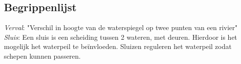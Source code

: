\documentclass[../verslag.tex]{subfiles}
\begin{document}
\subsection{Begrippenlijst}
\emph{Verval}: "Verschil in hoogte van de waterspiegel op twee punten van een rivier" \cite{dvd_verval}\\
\emph{Sluis}: Een sluis is een scheiding tussen 2 wateren, met deuren. Hierdoor is het mogelijk het waterpeil te beïnvloeden. Sluizen reguleren het waterpeil zodat schepen kunnen passeren. \cite{rws_2022}
\end{document}
